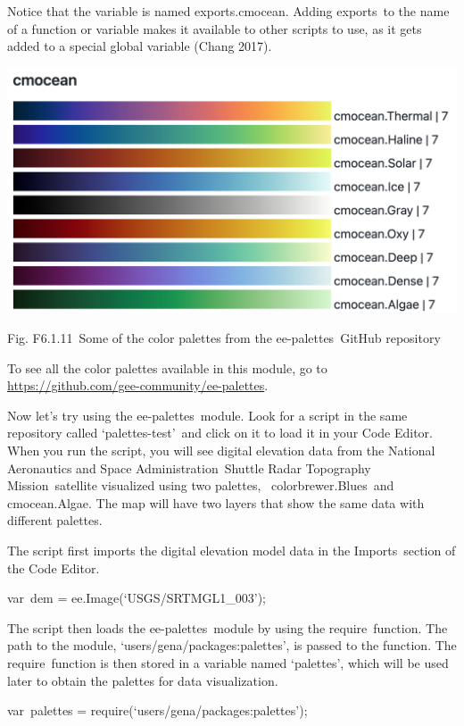 \documentclass[
  letterpaper,
  DIV=11,
  numbers=noendperiod]{scrreprt}
\begin{document}
Notice that the variable is named exports.cmocean. Adding exports~to the
name of a function or variable makes it available to other scripts to
use, as it gets added to a special global variable (Chang 2017).

\includegraphics{./F6/image52.png}

Fig. F6.1.11~Some of the color palettes from the ee-palettes~GitHub
repository

To see all the color palettes available in this module, go to
\href{https://www.google.com/url?q=https://github.com/gee-community/ee-palettes\&sa=D\&source=editors\&ust=1671458841155957\&usg=AOvVaw30bltn2S4_BDlhyuKIvkZH}{https://github.com/gee-community/ee-palettes}.

Now let's try using the ee-palettes~module. Look for a script in the
same repository called `palettes-test'~and click on it to load it in
your Code Editor. When you run the script, you will see digital
elevation data from the National Aeronautics and Space
Administration~Shuttle Radar Topography Mission~satellite visualized
using two palettes, ~colorbrewer.Blues~and cmocean.Algae. The map will
have two layers that show the same data with different palettes.

The script first imports the digital elevation model data in the
Imports~section of the Code Editor.

var~dem = ee.Image(`USGS/SRTMGL1\_003');

The script then loads the ee-palettes~module by using the
require~function. The path to the module,
`users/gena/packages:palettes', is passed to the function. The
require~function is then stored in a variable named `palettes', which
will be used later to obtain the palettes for data visualization.

var~palettes = require(`users/gena/packages:palettes');
\end{document}
